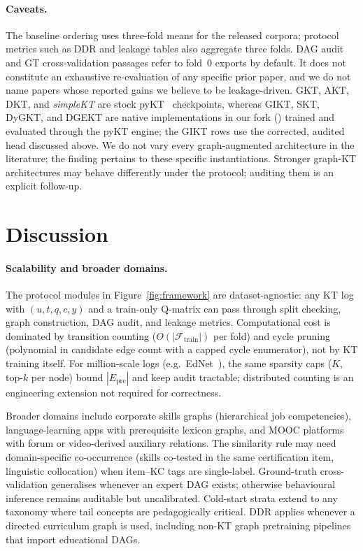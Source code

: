 \documentclass[pdflatex,sn-basic]{sn-jnl}
\newcommand{\Epre}{\ensuremath{E_{\text{pre}}}}
\newcommand{\DDR}{\textsc{DDR}}
\begin{document}
\paragraph{Caveats.}
The baseline ordering uses three-fold means for the released corpora; protocol
metrics such as \DDR{} and leakage tables also aggregate three folds. DAG audit and
GT cross-validation passages refer to fold~0 exports by default. It does not
constitute an exhaustive re-evaluation of any specific
prior paper, and we do not name papers whose reported gains we believe
to be leakage-driven. GKT, AKT, DKT, and \textit{simpleKT} are stock
pyKT~\cite{liu2022pykt} checkpoints, whereas GIKT, SKT, DyGKT, and DGEKT are
native implementations in our fork () trained and evaluated
through the pyKT engine; the GIKT rows use the corrected, audited head
discussed above. We do not vary every graph-augmented architecture
in the literature; the finding pertains to these specific instantiations.
Stronger graph-KT architectures
\cite{tong2020skt,dygkt2024,dgekt2024} may behave differently under
the protocol; auditing them is an explicit follow-up.
\section{Discussion}
\label{sec:disc}
\paragraph{Scalability and broader domains.}
The protocol modules in Figure~\ref{fig:framework} are dataset-agnostic:
any KT log with $(u,t,q,c,y)$ and a train-only Q-matrix can pass through
split checking, graph construction, DAG audit, and leakage metrics.
Computational cost is dominated by transition counting
($O(|\mathcal{F}_{\text{train}}|)$ per fold) and cycle pruning
(polynomial in candidate edge count with a capped cycle enumerator), not
by KT training itself. For million-scale logs (e.g.\ EdNet~\cite{choi2020ednet}),
the same sparsity caps ($K$, top-$k$ per node) bound $|\Epre|$ and keep
audit tractable; distributed counting is an engineering extension not
required for correctness.

Broader domains include corporate skills graphs (hierarchical job
competencies), language-learning apps with prerequisite lexicon graphs,
and MOOC platforms with forum or video-derived auxiliary relations. The
similarity rule may need domain-specific co-occurrence (skills co-tested
in the same certification item, linguistic collocation) when item--KC
tags are single-label. Ground-truth cross-validation generalises whenever
an expert DAG exists; otherwise behavioural inference remains auditable
but uncalibrated. Cold-start strata extend to any taxonomy where tail
concepts are pedagogically critical. \DDR{} applies whenever a directed
curriculum graph is used, including non-KT graph pretraining pipelines
that import educational DAGs.
\end{document}
